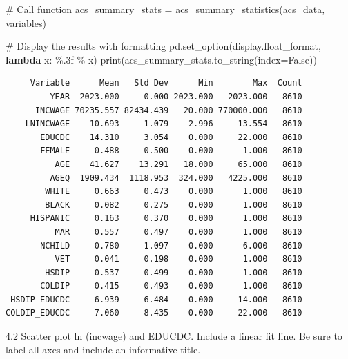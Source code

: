 \documentclass[
  11pt,
  letterpaper,
  DIV=11,
  numbers=noendperiod]{scrartcl}
\newenvironment{Shaded}{\begin{snugshade}}{\end{snugshade}}
\newcommand{\BuiltInTok}[1]{\textcolor[rgb]{0.00,0.23,0.31}{#1}}
\newcommand{\CommentTok}[1]{\textcolor[rgb]{0.37,0.37,0.37}{#1}}
\newcommand{\KeywordTok}[1]{\textcolor[rgb]{0.00,0.23,0.31}{\textbf{#1}}}
\newcommand{\NormalTok}[1]{\textcolor[rgb]{0.00,0.23,0.31}{#1}}
\newcommand{\OperatorTok}[1]{\textcolor[rgb]{0.37,0.37,0.37}{#1}}
\newcommand{\SpecialCharTok}[1]{\textcolor[rgb]{0.37,0.37,0.37}{#1}}
\newcommand{\StringTok}[1]{\textcolor[rgb]{0.13,0.47,0.30}{#1}}
\newcommand{\VariableTok}[1]{\textcolor[rgb]{0.07,0.07,0.07}{#1}}
\begin{document}
\begin{Shaded}
\begin{Highlighting}[]
\CommentTok{\# Call function}
\NormalTok{acs\_summary\_stats }\OperatorTok{=}\NormalTok{ acs\_summary\_statistics(acs\_data, variables)}

\CommentTok{\# Display the results with formatting}
\NormalTok{pd.set\_option(}\StringTok{\textquotesingle{}display.float\_format\textquotesingle{}}\NormalTok{, }\KeywordTok{lambda}\NormalTok{ x: }\StringTok{\textquotesingle{}}\SpecialCharTok{\%.3f}\StringTok{\textquotesingle{}} \OperatorTok{\%}\NormalTok{ x) }
\BuiltInTok{print}\NormalTok{(acs\_summary\_stats.to\_string(index}\OperatorTok{=}\VariableTok{False}\NormalTok{))  }
\end{Highlighting}
\end{Shaded}

\begin{verbatim}
     Variable      Mean   Std Dev      Min        Max  Count
         YEAR  2023.000     0.000 2023.000   2023.000   8610
      INCWAGE 70235.557 82434.439   20.000 770000.000   8610
    LNINCWAGE    10.693     1.079    2.996     13.554   8610
       EDUCDC    14.310     3.054    0.000     22.000   8610
       FEMALE     0.488     0.500    0.000      1.000   8610
          AGE    41.627    13.291   18.000     65.000   8610
         AGEQ  1909.434  1118.953  324.000   4225.000   8610
        WHITE     0.663     0.473    0.000      1.000   8610
        BLACK     0.082     0.275    0.000      1.000   8610
     HISPANIC     0.163     0.370    0.000      1.000   8610
          MAR     0.557     0.497    0.000      1.000   8610
       NCHILD     0.780     1.097    0.000      6.000   8610
          VET     0.041     0.198    0.000      1.000   8610
        HSDIP     0.537     0.499    0.000      1.000   8610
       COLDIP     0.415     0.493    0.000      1.000   8610
 HSDIP_EDUCDC     6.939     6.484    0.000     14.000   8610
COLDIP_EDUCDC     7.060     8.435    0.000     22.000   8610
\end{verbatim}

4.2 Scatter plot ln (incwage) and EDUCDC. Include a linear fit line. Be
sure to label all axes and include an informative title.
\end{document}
